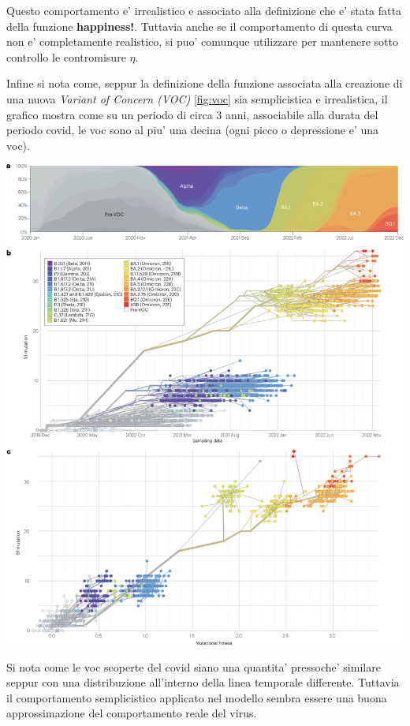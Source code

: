 Questo comportamento e' irrealistico e associato alla definizione che e' stata fatta della 
funzione \textbf{happiness!}. Tuttavia anche se il comportamento di questa curva non e' 
completamente realistico, si puo' comunque utilizzare per mantenere sotto controllo le contromisure $\eta$.

Infine si nota come, seppur la definizione della funzione associata alla creazione di una
nuova \emph{Variant of Concern (VOC)} \ref{fig:voc} sia semplicistica e irrealistica, 
il grafico mostra come su un periodo di circa 3 anni, associabile alla durata del periodo covid, 
le voc sono al piu' una decina (ogni picco o depressione e' una voc). 

\begin{minipage}{\linewidth}
	\centering
	\includegraphics[width=\textwidth, height=\textheight]{img/41579_2023_878_Fig3_HTML.png}
	\label{fig:covid_mutation}
\end{minipage}

Si nota come le voc scoperte del covid siano una quantita' pressoche' similare seppur con una 
distribuzione all'interno della linea temporale differente. Tuttavia il comportamento semplicistico 
applicato nel modello sembra essere una buona approssimazione del comportamento reale del virus.

